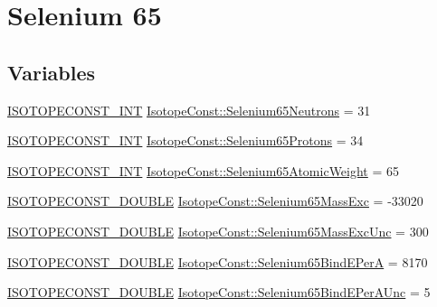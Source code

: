 \hypertarget{group___isotope_const-_selenium-_se65}{}\section{Selenium 65}
\label{group___isotope_const-_selenium-_se65}
\subsection*{Variables}
\begin{DoxyCompactItemize}
\item 
\mbox{\hyperlink{group___isotope_const-_macros_ga5f18360b3e99483a35c32d789e62621c}{I\+S\+O\+T\+O\+P\+E\+C\+O\+N\+S\+T\+\_\+\+I\+NT}} \mbox{\hyperlink{group___isotope_const-_selenium-_se65_ga32d73d30c1a922f7a814b7a4b96ffa7a}{Isotope\+Const\+::\+Selenium65\+Neutrons}} = 31
\item 
\mbox{\hyperlink{group___isotope_const-_macros_ga5f18360b3e99483a35c32d789e62621c}{I\+S\+O\+T\+O\+P\+E\+C\+O\+N\+S\+T\+\_\+\+I\+NT}} \mbox{\hyperlink{group___isotope_const-_selenium-_se65_ga8cb3932f1a0009826750ab264619116a}{Isotope\+Const\+::\+Selenium65\+Protons}} = 34
\item 
\mbox{\hyperlink{group___isotope_const-_macros_ga5f18360b3e99483a35c32d789e62621c}{I\+S\+O\+T\+O\+P\+E\+C\+O\+N\+S\+T\+\_\+\+I\+NT}} \mbox{\hyperlink{group___isotope_const-_selenium-_se65_gaf16c37d1c383cf4af56d69a584c9cbbd}{Isotope\+Const\+::\+Selenium65\+Atomic\+Weight}} = 65
\item 
\mbox{\hyperlink{group___isotope_const-_macros_ga8f45a7272ce02c0b4c65c44636ed719a}{I\+S\+O\+T\+O\+P\+E\+C\+O\+N\+S\+T\+\_\+\+D\+O\+U\+B\+LE}} \mbox{\hyperlink{group___isotope_const-_selenium-_se65_gac1a0112106c4aa2f5e4a5cdc00a9a50c}{Isotope\+Const\+::\+Selenium65\+Mass\+Exc}} = -\/33020
\item 
\mbox{\hyperlink{group___isotope_const-_macros_ga8f45a7272ce02c0b4c65c44636ed719a}{I\+S\+O\+T\+O\+P\+E\+C\+O\+N\+S\+T\+\_\+\+D\+O\+U\+B\+LE}} \mbox{\hyperlink{group___isotope_const-_selenium-_se65_ga27c718971245554e2eec3831d33878a4}{Isotope\+Const\+::\+Selenium65\+Mass\+Exc\+Unc}} = 300
\item 
\mbox{\hyperlink{group___isotope_const-_macros_ga8f45a7272ce02c0b4c65c44636ed719a}{I\+S\+O\+T\+O\+P\+E\+C\+O\+N\+S\+T\+\_\+\+D\+O\+U\+B\+LE}} \mbox{\hyperlink{group___isotope_const-_selenium-_se65_gac05fcb4e7cf11d8c3f4234f0c5af98f2}{Isotope\+Const\+::\+Selenium65\+Bind\+E\+PerA}} = 8170
\item 
\mbox{\hyperlink{group___isotope_const-_macros_ga8f45a7272ce02c0b4c65c44636ed719a}{I\+S\+O\+T\+O\+P\+E\+C\+O\+N\+S\+T\+\_\+\+D\+O\+U\+B\+LE}} \mbox{\hyperlink{group___isotope_const-_selenium-_se65_ga02de16665d8e4bb82a448fd50fa28c8d}{Isotope\+Const\+::\+Selenium65\+Bind\+E\+Per\+A\+Unc}} = 5

\end{DoxyCompactItemize}
